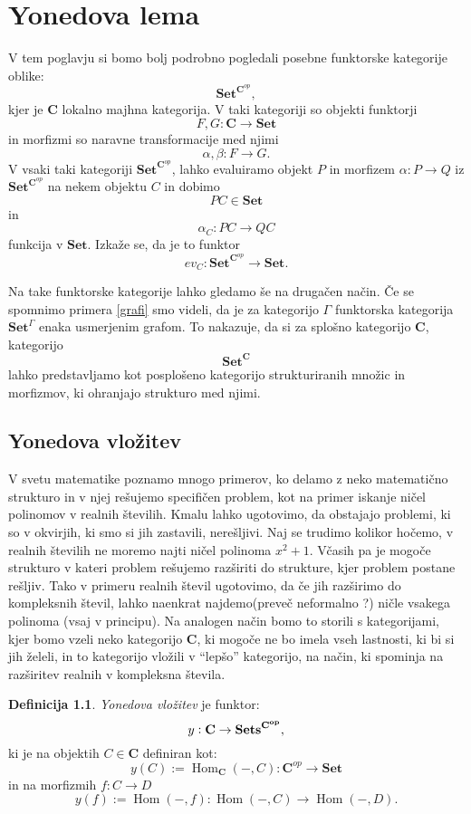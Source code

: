 \documentclass[12pt,a4paper]{book}
\theoremstyle{definition}
\newtheorem{definicija}{Definicija}[chapter]
\theoremstyle{plain}
\theoremstyle{definition}
\theoremstyle{remark}
\newcommand{\cat}[1]{\textbf{#1}}
\DeclareMathOperator{\Hom}{Hom}
\newcommand{\predsnop}[1]{\cat{Set}^{\cat{#1}^{op}}}
\begin{document}
\chapter{Yonedova lema}

V tem poglavju si bomo bolj podrobno pogledali posebne funktorske kategorije oblike:
$$\predsnop{C},$$
kjer je $\cat{C}$ lokalno majhna kategorija. V taki kategoriji so objekti funktorji 
$$F,G : \cat{C} \to \cat{Set}$$
in morfizmi so naravne transformacije med njimi
$$\alpha, \beta : F \to G.$$ 
V vsaki taki kategoriji $\predsnop{C}$, lahko evaluiramo objekt $P$ in morfizem $\alpha : P \to Q$ iz $\predsnop{C}$ na nekem objektu $C$ in dobimo 
$$PC \in \cat{Set}$$ 
in 
$$\alpha_C : PC \to QC$$
funkcija v $\cat{Set}$. Izkaže se, da je to funktor
$$ ev_C : \predsnop{C} \to \cat{Set}.$$

Na take funktorske kategorije lahko gledamo še na drugačen način.
Če se spomnimo primera \ref{grafi} smo videli, da je za kategorijo $\Gamma$ funktorska kategorija $\cat{Set}^\Gamma$ enaka usmerjenim grafom. To nakazuje, da si za splošno kategorijo $\cat{C}$, kategorijo
$$\cat{Set}^\cat{C}$$
lahko predstavljamo kot posplošeno kategorijo strukturiranih množic in morfizmov, ki ohranjajo strukturo med njimi.


\section{Yonedova vložitev}

V svetu matematike poznamo mnogo primerov, ko delamo z neko matematično strukturo in v njej rešujemo specifičen problem, kot na primer iskanje ničel polinomov v realnih številih. Kmalu lahko ugotovimo, da obstajajo problemi, ki so v okvirjih, ki smo si jih zastavili, nerešljivi. Naj se trudimo kolikor hočemo, v realnih številih ne moremo najti ničel polinoma $x^2 + 1$.
Včasih pa je mogoče strukturo v kateri problem rešujemo razširiti do strukture, kjer problem postane rešljiv.
Tako v primeru realnih števil ugotovimo, da če jih razširimo do kompleksnih števil, lahko naenkrat najdemo(preveč neformalno ?) ničle vsakega polinoma (vsaj v principu). Na analogen način bomo to storili s kategorijami, kjer bomo vzeli neko kategorijo $\cat{C}$, ki mogoče ne bo imela vseh lastnosti, ki bi si jih želeli, in to kategorijo vložili v "`lepšo"' kategorijo, na način, ki spominja na razširitev realnih v kompleksna števila. 


\begin{definicija} \emph{Yonedova vložitev} je funktor: 
$$y : \bf{C} \to \bf{Sets}^{\bf{C}^{op}},$$
ki je na objektih $C \in \cat{C}$ definiran kot:
$$y(C) := \Hom_{\cat{C}}(-, C) : \cat{C}^{op} \to \cat{Set}$$ 
in na morfizmih $f : C \to D$
$$y(f) := \Hom(-,f) : \Hom(-,C) \to \Hom(-,D).$$
\end{definicija}
\end{document}
